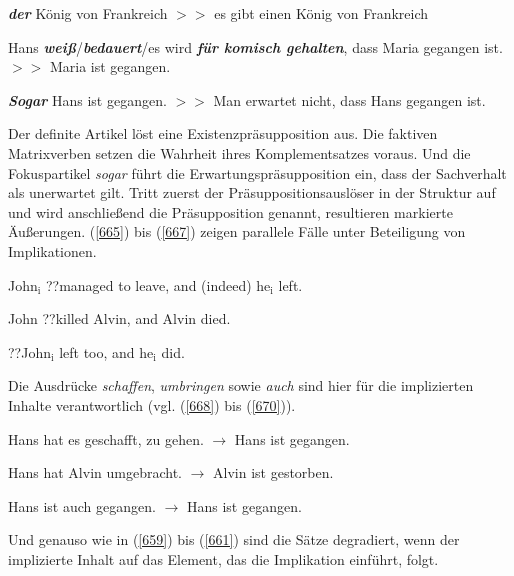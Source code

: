 \begin{exe}
	\ex\label{662} 
	\textbf{\textit{der}} König von Frankreich $>>$ es gibt einen König von Frankreich
\end{exe}
\vspace{-0.65cm}
\begin{exe}
	\ex\label{663} 
	Hans \textbf{\textit{weiß}}/\textbf{\textit{bedauert}}/es wird \textbf{\textit{für komisch gehalten}}, dass Maria gegangen ist. $>>$ Maria ist gegangen.
\end{exe}
\vspace{-0.65cm}
\begin{exe}
	\ex\label{664} 
	\textbf{\textit{Sogar}} Hans ist gegangen. $>>$ Man erwartet nicht, dass Hans gegangen ist.
\end{exe}
Der definite Artikel löst eine Existenzpräsupposition  aus. Die faktiven Matrixverben  setzen die Wahrheit ihres Komplementsatzes voraus. Und die Fokuspartikel  \textit{sogar} führt die Erwartungspräsupposition  ein, dass der Sachverhalt als unerwartet gilt. Tritt zuerst der Präsuppositionsauslöser in der Struktur auf und wird anschließend die Präsupposition genannt, resultieren markierte Äußerungen. (\ref{665}) bis (\ref{667}) zeigen parallele Fälle unter Beteiligung von Implikationen.

\begin{exe}
	\ex\label{665} 
	John$_{\textrm{i}}$ ??managed to leave, and (indeed) he$_{\textrm{i}}$ left.
\end{exe}
\vspace{-0.65cm}
\begin{exe}
	\ex\label{566} 
	John ??killed Alvin, and Alvin died.
\end{exe}
\vspace{-0.65cm}
\begin{exe}
	\ex\label{667} 
	??John$_{\textrm{i}}$ left too, and he$_{\textrm{i}}$ did.
	\hfill\hbox {\citet[64/64/66]{Horn1976}}
\end{exe}						
Die Ausdrücke \textit{schaffen}, \textit{umbringen} sowie \textit{auch} sind hier für die implizierten Inhalte verantwortlich (vgl. (\ref{668}) bis (\ref{670})).

\begin{exe}
	\ex\label{668} 
	Hans hat es geschafft, zu gehen. $\rightarrow$ Hans ist gegangen.
\end{exe}
\vspace{-0.65cm}
\begin{exe}
	\ex\label{669} 
	Hans hat Alvin umgebracht. $\rightarrow$ Alvin ist gestorben.
\end{exe}
\vspace{-0.65cm}
\begin{exe}
	\ex\label{670} 
	Hans ist auch gegangen. $\rightarrow$ Hans ist gegangen.
\end{exe}
Und genauso wie in (\ref{659}) bis (\ref{661}) sind die Sätze degradiert, wenn der implizierte Inhalt auf das Element, das die Implikation einführt, folgt.

